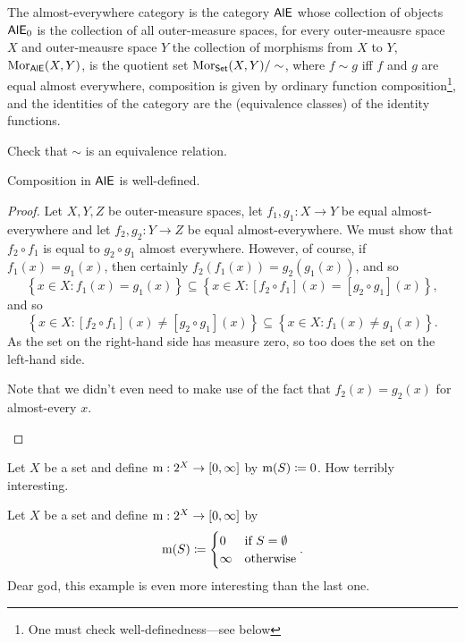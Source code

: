 \begin{exm}
The almost-everywhere category is the category $\mathsf{AlE}$ whose collection of objects $\mathsf{AlE} _0$ is the collection of all outer-measure spaces, for every outer-meausre space $X$ and outer-meausre space $Y$ the collection of morphisms from $X$ to $Y$, $\operatorname{Mor} _{\mathsf{AlE}}(X,Y)$, is the quotient set $\operatorname{Mor} _{\mathsf{Set}}(X,Y)/\sim$, where $f\sim g$ iff $f$ and $g$ are equal almost everywhere, composition is given by ordinary function composition\footnote{One must check well-definedness---see below}, and the identities of the category are the (equivalence classes) of the identity functions.
\begin{exr}
Check that $\sim$ is an equivalence relation.
\end{exr}
\begin{prp}
Composition in $\mathsf{AlE}$ is well-defined.
\begin{proof}
Let $X,Y,Z$ be outer-measure spaces, let $f_1,g_1:X\rightarrow Y$ be equal almost-everywhere and let $f_2,g_2:Y\rightarrow Z$ be equal almost-everywhere.  We must show that $f_2\circ f_1$ is equal to $g_2\circ g_1$ almost everywhere.  However, of course, if $f_1(x)=g_1(x)$, then certainly $f_2(f_1(x))=g_2(g_1(x))$, and so
\begin{equation}
\left\{ x\in X:f_1(x)=g_1(x)\right\} \subseteq \left\{ x\in X:[f_2\circ f_1](x)=[g_2\circ g_1](x)\right\} ,
\end{equation}
and so
\begin{equation}
\left\{ x\in X:[f_2\circ f_1](x)\neq [g_2\circ g_1](x)\right\} \subseteq \left\{ x\in X:f_1(x)\neq g_1(x)\right\} .
\end{equation}
As the set on the right-hand side has measure zero, so too does the set on the left-hand side.
\begin{rmk}
Note that we didn't even need to make use of the fact that $f_2(x)=g_2(x)$ for almost-every $x$.
\end{rmk}
\end{proof}
\end{prp}
\end{exm}
\begin{exm}\label{ZeroMeasure}
Let $X$ be a set and define $\mathrm{m} :2^X\rightarrow [0,\infty ]$ by $\mathrm{m} (S)\coloneqq 0$.  How terribly interesting.
\end{exm}
\begin{exm}\label{InfiniteMeasure}
Let $X$ be a set and define $\mathrm{m} :2^X\rightarrow [0,\infty ]$ by
\begin{equation}
\mathrm{m} (S)\coloneqq \begin{cases}0 & \text{if }S=\emptyset \\ \infty & \text{otherwise}\end{cases}.
\end{equation}
Dear god, this example is even more interesting than the last one.
\end{exm}

